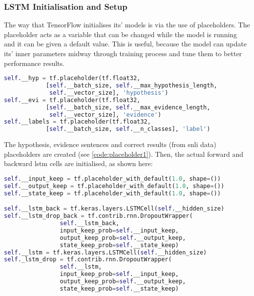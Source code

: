        \subsubsection{LSTM Initialisation and Setup}
            The way that TensorFlow initialises its' models is via the use of placeholders. The placeholder acts as a variable that can be changed while the model is running and it can be given a default value. This is useful, because the model can update its' inner parameters midway through training process and tune them to better performance results.
            
            \begin{lstlisting}[language=Python, caption=Placeholders for Sentences and Results, label=code:placeholder1]
self.__hyp = tf.placeholder(tf.float32, 
            [self.__batch_size, self.__max_hypothesis_length, 
             self.__vector_size], 'hypothesis')
self.__evi = tf.placeholder(tf.float32, 
            [self.__batch_size, self.__max_evidence_length, 
             self.__vector_size], 'evidence')
self.__labels = tf.placeholder(tf.float32, 
            [self.__batch_size, self.__n_classes], 'label')
            \end{lstlisting}
            
            The hypothesis, evidence sentences and correct results (from \gls{snli} data) placeholders are created (see \cref{code:placeholder1}). Then, the actual forward and backward \gls{lstm} cells are initialised, as shown here:
            
            \begin{lstlisting}[language=Python, caption=Initialisation of LSTM, label=code:placeholder2]
self.__input_keep = tf.placeholder_with_default(1.0, shape=())
self.__output_keep = tf.placeholder_with_default(1.0, shape=())
self.__state_keep = tf.placeholder_with_default(1.0, shape=())

self.__lstm_back = tf.keras.layers.LSTMCell(self.__hidden_size)
self.__lstm_drop_back = tf.contrib.rnn.DropoutWrapper(
                self.__lstm_back,
                input_keep_prob=self.__input_keep,
                output_keep_prob=self.__output_keep,
                state_keep_prob=self.__state_keep)
self.__lstm = tf.keras.layers.LSTMCell(self.__hidden_size)
self._lstm_drop = tf.contrib.rnn.DropoutWrapper(
                self.__lstm,
                input_keep_prob=self.__input_keep,
                output_keep_prob=self.__output_keep,
                state_keep_prob=self.__state_keep)
            \end{lstlisting}
            
